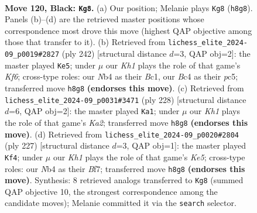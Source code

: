 \documentclass[11pt]{article}
\begin{document}
\clearpage

\begin{figure}[p]\centering
\begin{subfigure}{0.46\textwidth}\centering
\resizebox{\linewidth}{!}{%
\newchessgame
\chessboard[
  setfen={1B5k/8/7K/8/1nb2P2/8/8/8 b - - 4 120},
  showmover=false,
  pgfstyle=straightmove, color=movearrow, markmove={h8-g8}
]}
\caption{}
\end{subfigure}\hfill
\begin{subfigure}{0.46\textwidth}\centering
\resizebox{\linewidth}{!}{%
\newchessgame
\chessboard[
  setfen={8/7k/b4K2/2p5/8/3p4/8/2B5 w - - 0 122},
  showmover=false,
  pgfstyle=straightmove, color=movearrow, markmove={f6-e5}
]}
\caption{}
\end{subfigure}
\\[4pt]
\begin{subfigure}{0.46\textwidth}\centering
\resizebox{\linewidth}{!}{%
\newchessgame
\chessboard[
  setfen={8/8/p7/8/1k6/3b4/K7/8 w - - 40 115},
  showmover=false,
  pgfstyle=straightmove, color=movearrow, markmove={a2-a1}
]}
\caption{}
\end{subfigure}\hfill
\begin{subfigure}{0.46\textwidth}\centering
\resizebox{\linewidth}{!}{%
\newchessgame
\chessboard[
  setfen={8/5b2/2K2P2/8/4k3/2B5/8/8 b - - 42 114},
  showmover=false,
  pgfstyle=straightmove, color=movearrow, markmove={e4-f4}
]}
\caption{}
\end{subfigure}
\caption{\textbf{Move 120, Black: \texttt{Kg8}.} (a) Our position; Melanie plays \texttt{Kg8} (\texttt{h8g8}). Panels (b)--(d) are the retrieved master positions whose correspondence most drove this move (highest QAP objective among those that transfer to it). (b) Retrieved from \texttt{lichess\_elite\_2024-09\_p0019\#2827} (ply 242) [structural distance $d$=3, QAP obj=2]: the master played \texttt{Ke5}; under $\mu$ our \emph{Kh1} plays the role of that game's \emph{Kf6}; cross-type roles: our \emph{N}b4 as their \emph{B}c1, our \emph{B}c4 as their \emph{p}c5; transferred move \texttt{h8g8} \textbf{(endorses this move)}. (c) Retrieved from \texttt{lichess\_elite\_2024-09\_p0031\#3471} (ply 228) [structural distance $d$=6, QAP obj=2]: the master played \texttt{Ka1}; under $\mu$ our \emph{Kh1} plays the role of that game's \emph{Ka2}; transferred move \texttt{h8g8} \textbf{(endorses this move)}. (d) Retrieved from \texttt{lichess\_elite\_2024-09\_p0020\#2804} (ply 227) [structural distance $d$=3, QAP obj=1]: the master played \texttt{Kf4}; under $\mu$ our \emph{Kh1} plays the role of that game's \emph{Ke5}; cross-type roles: our \emph{N}b4 as their \emph{B}f7; transferred move \texttt{h8g8} \textbf{(endorses this move)}. Synthesis: 8 retrieved analogs transferred to \texttt{Kg8} (summed QAP objective 10, the strongest correspondence among the candidate moves); Melanie committed it via the \texttt{search} selector.}
\label{fig:thought-m239}
\end{figure}
\end{document}
